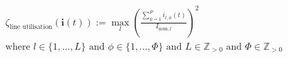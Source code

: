 \begin{equation}
\begin{split}
	&\zeta_\text{line utilisation}(\textbf{i}(t)) :=
	\max_{l}{\left(\frac{\sum_{\phi=1}^{P}{i_{l,\phi}(t)}}{I_{\text{nom},l}}\right)^2} \\
	&\text{where } l \in \{1, \dots, L\} \text{ and } \phi \in \{1, \dots, \Phi\} \text{ and } L \in \mathbb{Z}_{>0} \text{ and } \Phi \in \mathbb{Z}_{>0}
\end{split}
\label{ch1:equ:line-utilisation}
\end{equation}